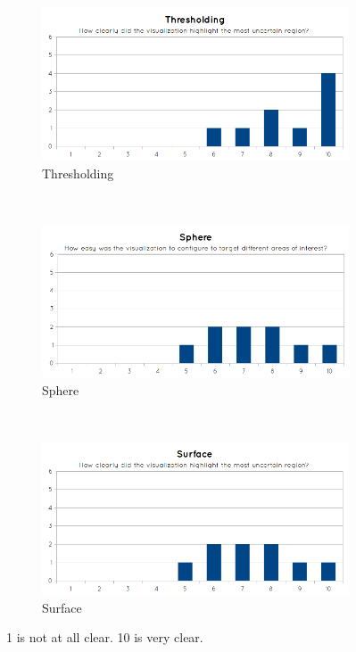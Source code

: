 \begin{figure}[H]
  \centering
  \begin{subfigure}[b]{0.32\textwidth}
    \includegraphics[width=\textwidth]{images/evaluation/graph_thresholding_2.png}
    \caption*{Thresholding}
    \label{fig:eval_visualization_q2_thresholding}
  \end{subfigure}%
  ~ %
  \begin{subfigure}[b]{0.32\textwidth}
    \includegraphics[width=\textwidth]{images/evaluation/graph_sphere_2.png}
    \caption*{Sphere}
    \label{fig:eval_visualization_q2_sphere}
  \end{subfigure}%
  ~ %
  \begin{subfigure}[b]{0.32\textwidth}
    \includegraphics[width=\textwidth]{images/evaluation/graph_surface_2.png}
    \caption*{Surface}
    \label{fig:eval_visualization_q2_surface}  
  \end{subfigure}
  \caption{1 is not at all clear. 10 is very clear.}\label{fig:eval_visualization_q2}
\end{figure}


